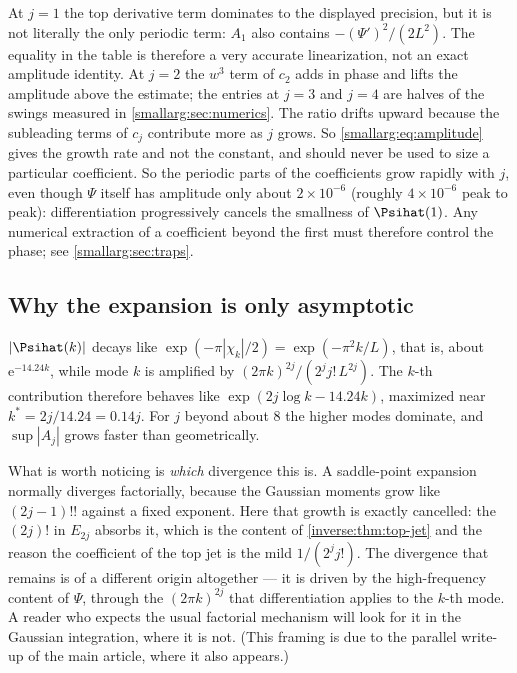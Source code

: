 \documentclass[11pt,oneside]{article}
\theoremstyle{definition}
\theoremstyle{remark}
\newcommand{\e}{\mathrm e}
\begin{document}
At $j=1$ the top derivative term dominates to the displayed precision, but it is not literally the only periodic term: $A_1$ also contains $-(\Psi')^2/(2L^2)$.  The equality in the table is therefore a very accurate linearization, not an exact amplitude identity.  At
$j=2$ the $w^3$ term of $c_2$ adds in phase and lifts the amplitude above
the estimate; the entries at $j=3$ and $j=4$ are halves of the swings
measured in \cref{smallarg:sec:numerics}.  The ratio drifts upward because the
subleading terms of $c_j$ contribute more as $j$ grows.  So
\cref{smallarg:eq:amplitude} gives the growth rate and not the constant, and should
never be used to size a particular coefficient.  So the periodic parts of
the coefficients grow rapidly with $j$, even though \(\Psi\) itself has
amplitude only about \(2\times10^{-6}\) (roughly \(4\times10^{-6}\) peak to
peak): differentiation progressively cancels the smallness of
$\Psihat(1)$.  Any numerical extraction of a coefficient beyond the first must
therefore control the phase; see \cref{smallarg:sec:traps}.

\subsection{Why the expansion is only asymptotic}

$|\Psihat(k)|$ decays like $\exp(-\pi|\chi_k|/2)=\exp(-\pi^2k/L)$, that is,
about $\e^{-14.24k}$, while mode $k$ is amplified by
$(2\pi k)^{2j}/(2^jj!\,L^{2j})$.  The $k$-th contribution therefore behaves like
$\exp(2j\log k-14.24k)$, maximized near $k^\ast=2j/14.24=0.14j$.  For $j$ beyond
about $8$ the higher modes dominate, and $\sup|A_j|$ grows faster than
geometrically.

What is worth noticing is \emph{which} divergence this is.  A saddle-point
expansion normally diverges factorially, because the Gaussian moments grow
like $(2j-1)!!$ against a fixed exponent.  Here that growth is exactly
cancelled: the $(2j)!$ in $E_{2j}$ absorbs it, which is the content of
\cref{inverse:thm:top-jet} and the reason the coefficient of the top jet is the mild
$1/(2^jj!)$.  The divergence that remains is of a different origin
altogether --- it is driven by the high-frequency content of $\Psi$, through
the $(2\pi k)^{2j}$ that differentiation applies to the $k$-th mode.  A
reader who expects the usual factorial mechanism will look for it in the
Gaussian integration, where it is not.  (This framing is due to the parallel
write-up of the main article, where it also appears.)
\end{document}

